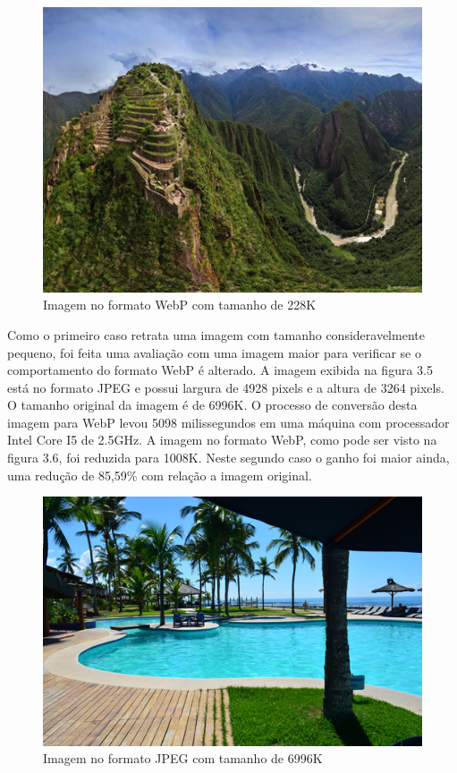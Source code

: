 \documentclass[espaco=simples,appendix=Name]{abnt}
\begin{document}
\begin{figure}[h]
  \centering
    \includegraphics[scale=0.5]{Imagem1WEBP.png}
  \caption{Imagem no formato WebP com tamanho de 228K}
\end{figure}

Como o primeiro caso retrata uma imagem com tamanho consideravelmente pequeno, foi feita uma avaliação com uma imagem maior para verificar se o comportamento do formato WebP é alterado. A imagem exibida na figura 3.5 está no formato JPEG e possui largura de 4928 pixels e a altura de 3264 pixels. O tamanho original da imagem é de 6996K. O processo de conversão desta imagem para WebP levou 5098 milissegundos em uma máquina com processador Intel Core I5 de 2.5GHz. A imagem no formato WebP, como pode ser visto na figura 3.6, foi reduzida para 1008K. Neste segundo caso o ganho foi maior ainda, uma redução de 85,59\% com relação a imagem original.

\begin{figure}[h]
  \centering
    \includegraphics[scale=0.5]{Imagem2JPEG.png}
  \caption{Imagem no formato JPEG com tamanho de 6996K}
\end{figure}
\end{document}
